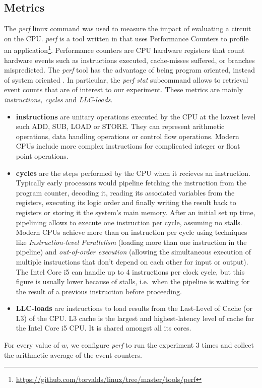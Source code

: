 \subsection{Metrics}
The \textit{perf} linux command was used to measure the impact of evaluating a circuit on the CPU. \textit{perf} is a tool written in  that uses Performance Counters to profile an application\footnote{\url{https://github.com/torvalds/linux/tree/master/tools/perf}}. Performance counters are CPU hardware registers that count hardware events such as instructions executed, cache-misses suffered, or branches mispredicted\cite{perfwiki}. The \textit{perf} tool has the advantage of being program oriented, instead of system oriented \cite{ibm}.   In particular, the \textit{perf stat} subcommand allows to retrieval event counts that are of interest to our experiment. These metrics are mainly \textit{instructions, cycles} and \textit{LLC-loads}. 
\begin{itemize}
\item \textbf{instructions} are unitary operations executed by the CPU at the lowest level such ADD, SUB, LOAD or STORE. They can represent arithmetic operations, data handling operations or control flow operations. Modern CPUs include more complex instructions for complicated integer or float point operations.
\item \textbf{cycles} are the steps performed by the CPU when it recieves an instruction. Typically early processors would pipeline fetching the instruction from the program counter, decoding it, reading its associated variables from the registers, executing its logic order and finally writing the result back to registers or storing it the system's main memory\cite{jmor}. After an initial set up time, pipelining allows to execute one instruction per cycle, assuming no stalls. Modern CPUs achieve more than on instruction per cycle using techniques like \textit{Instruction-level Parallelism} (loading more than one instruction in the pipeline) and \textit{out-of-order execution} (allowing the simultaneous execution of multiple instructions that don't depend on each other for input or output). The Intel Core i5 can handle up to 4 instructions per clock cycle\cite{agner}, but this figure is usually lower because of stalls, i.e.\ when the pipeline is waiting for the result of a previous instruction before proceeding.

\item \textbf{LLC-loads} are instructions to load results from the Last-Level of Cache (or L3) of the CPU. L3 cache is the largest and highest-latency level of cache for the Intel Core i5 CPU. It is shared amongst all its cores.

\end{itemize}
For every value of $w$, we configure \textit{perf} to run the experiment 3 times and collect the arithmetic average of the event counters.


